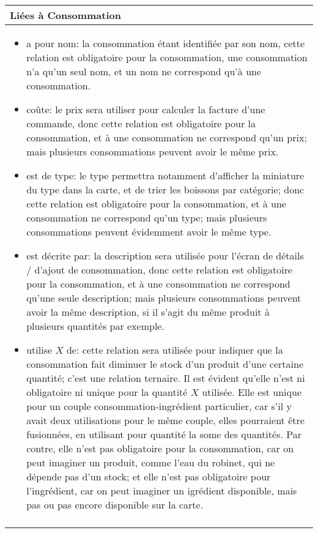 \documentclass[a4paper,10pt]{article}
\begin{document}
\begin{tabu}{X}
\textbf{Liées à Consommation}\\
\toprule

\begin{itemize}
    \item a pour nom: la consommation étant identifiée par son nom, cette relation est obligatoire pour la consommation, une consommation n'a qu'un seul nom, et un nom ne correspond qu'à une consommation.
    \item coûte: le prix sera utiliser pour calculer la facture d'une commande, donc cette relation est obligatoire pour la consommation, et à une consommation ne correspond qu'un prix; mais plusieurs consommations peuvent avoir le même prix.
    \item est de type: le type permettra notamment d'afficher la miniature du type dans la carte, et de trier les boissons par catégorie; donc cette relation est obligatoire pour la consommation, et à une consommation ne correspond qu'un type; mais plusieurs consommations peuvent évidemment avoir le même type.
    \item est décrite par: la description sera utilisée pour l'écran de détails / d'ajout de consommation, donc cette relation est obligatoire pour la consommation, et à une consommation ne correspond qu'une seule description; mais plusieurs consommations peuvent avoir la même description, si il s'agit du même produit à plusieurs quantités par exemple.
    \item utilise $X$ de: cette relation sera utilisée pour indiquer que la consommation fait diminuer le stock d'un produit d'une certaine quantité; c'est une relation ternaire. Il est évident qu'elle n'est ni obligatoire ni unique pour la quantité $X$ utilisée. Elle est unique pour un couple consommation-ingrédient particulier, car s'il y avait deux utilisations pour le même couple, elles pourraient être fusionnées, en utilisant pour quantité la some des quantités. Par contre, elle n'est pas obligatoire pour la consommation, car on peut imaginer un produit, comme l'eau du robinet, qui ne dépende pas d'un stock; et elle n'est pas obligatoire pour l'ingrédient, car on peut imaginer un igrédient disponible, mais pas ou pas encore disponible sur la carte.
\end{itemize}
\\\\
\end{tabu}
\end{document}

